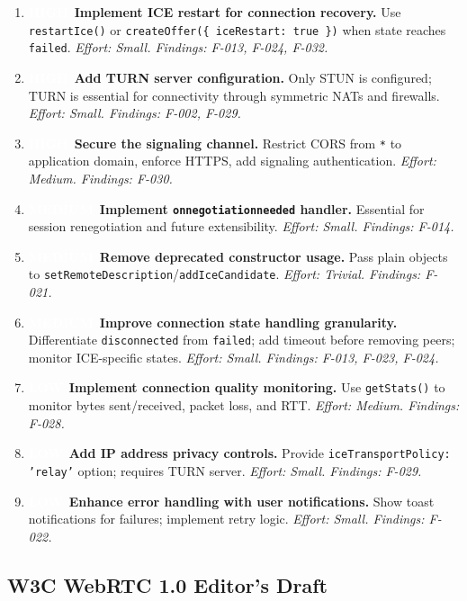\documentclass[11pt,letterpaper]{article}
\newcommand{\prihigh}{\colorbox{major}{\textcolor{white}{\small\textbf{HIGH}}}}
\newcommand{\primedium}{\colorbox{minor!80!black}{\textcolor{white}{\small\textbf{MEDIUM}}}}
\newcommand{\prilow}{\colorbox{notapplicable}{\textcolor{white}{\small\textbf{LOW}}}}
\begin{document}
\begin{enumerate}[leftmargin=2em]
    \item \prihigh\ \textbf{Implement ICE restart for connection recovery.} Use \texttt{restartIce()} or \texttt{createOffer(\{ iceRestart: true \})} when state reaches \texttt{failed}. \textit{Effort: Small. Findings: F-013, F-024, F-032.}
    \item \prihigh\ \textbf{Add TURN server configuration.} Only STUN is configured; TURN is essential for connectivity through symmetric NATs and firewalls. \textit{Effort: Small. Findings: F-002, F-029.}
    \item \prihigh\ \textbf{Secure the signaling channel.} Restrict CORS from \texttt{*} to application domain, enforce HTTPS, add signaling authentication. \textit{Effort: Medium. Findings: F-030.}
    \item \primedium\ \textbf{Implement \texttt{onnegotiationneeded} handler.} Essential for session renegotiation and future extensibility. \textit{Effort: Small. Findings: F-014.}
    \item \primedium\ \textbf{Remove deprecated constructor usage.} Pass plain objects to \texttt{setRemoteDescription}/\texttt{addIceCandidate}. \textit{Effort: Trivial. Findings: F-021.}
    \item \primedium\ \textbf{Improve connection state handling granularity.} Differentiate \texttt{disconnected} from \texttt{failed}; add timeout before removing peers; monitor ICE-specific states. \textit{Effort: Small. Findings: F-013, F-023, F-024.}
    \item \prilow\ \textbf{Implement connection quality monitoring.} Use \texttt{getStats()} to monitor bytes sent/received, packet loss, and RTT. \textit{Effort: Medium. Findings: F-028.}
    \item \prilow\ \textbf{Add IP address privacy controls.} Provide \texttt{iceTransportPolicy: 'relay'} option; requires TURN server. \textit{Effort: Small. Findings: F-029.}
    \item \prilow\ \textbf{Enhance error handling with user notifications.} Show toast notifications for failures; implement retry logic. \textit{Effort: Small. Findings: F-022.}
\end{enumerate}

\newpage

\subsection{W3C WebRTC 1.0 Editor's Draft}
\end{document}
